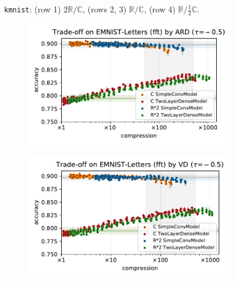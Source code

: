 \documentclass[a4paper,10pt,onecolumn]{article}
\newcommand{\real}{\mathbb{R}}
\newcommand{\cplx}{\mathbb{C}}
\begin{document}
\begin{figure}[b]
\begin{subfigure}[b]{0.5\columnwidth}
  \end{subfigure}
  \caption{%
    \texttt{kmnist}: (row 1) $2\real / \cplx$, (rows 2, 3) $\real / \cplx$, (row 4) $\real / \tfrac12\cplx$.
  }
\end{figure}

\begin{figure}[b]
  \centering
  \begin{subfigure}[b]{0.5\columnwidth}
    \centering
    \includegraphics[width=\columnwidth]{figure__mnist-like__trade-off/appendix__cmp__ARD__emnist_letters__fft__-0.5.pdf}
  \end{subfigure}%
  \begin{subfigure}[b]{0.5\columnwidth}
    \centering
    \includegraphics[width=\columnwidth]{figure__mnist-like__trade-off/appendix__cmp__VD__emnist_letters__fft__-0.5.pdf}
  \end{subfigure} \\%
  \begin{subfigure}[b]{0.5\columnwidth}

\end{subfigure}
\end{figure}
\end{document}
